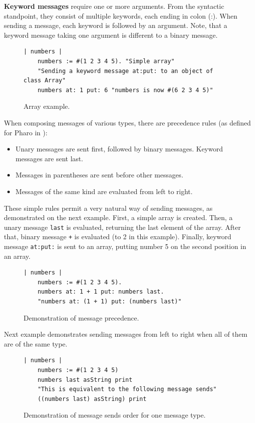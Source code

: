 \documentclass[thesis=M,english]{FITthesis}[2019/12/23]
\begin{document}
\textbf{Keyword messages} require one or more arguments. From the syntactic standpoint, they consist of
multiple keywords, each ending in colon (:). When sending a message, each keyword is followed by an argument.
Note, that a keyword message taking one argument is different to a binary message.
\begin{figure}[h!]
\begin{lstlisting}[language=Smalltalk]
	| numbers |
	numbers := #(1 2 3 4 5). "Simple array"
	"Sending a keyword message at:put: to an object of class Array"
	numbers at: 1 put: 6 "numbers is now #(6 2 3 4 5)"
\end{lstlisting}
\caption{Array example.}
\end{figure}

When composing messages of various types, there are precedence rules (as defined for Pharo in \cite{pharo-by-example}):
\begin{itemize}
	\item Unary messages are sent first, followed by binary messages. Keyword messages are sent last.
	\item Messages in parentheses are sent before other messages.
	\item Messages of the same kind are evaluated from left to right. 
\end{itemize}

These simple rules permit a very natural way of sending messages, as demonstrated on the next example.
First, a simple array is created. Then, a unary message \texttt{last} is evaluated, returning the last
element of the array. After that, binary message \texttt{+} is evaluated (to 2 in this example). Finally,
keyword message \texttt{at:put:} is sent to an array, putting number 5 on the second position in an array.
\begin{figure}[h!]
\begin{lstlisting}[language=Smalltalk]
	| numbers |
	numbers := #(1 2 3 4 5).
	numbers at: 1 + 1 put: numbers last.
	"numbers at: (1 + 1) put: (numbers last)"
\end{lstlisting}
\caption{Demonstration of message precedence.}
\end{figure}

Next example demonstrates sending messages from left to right when all of them are of the same type.
\begin{figure}[h!]
\begin{lstlisting}[language=Smalltalk]
	| numbers |
	numbers := #(1 2 3 4 5)
	numbers last asString print
	"This is equivalent to the following message sends"
	((numbers last) asString) print
\end{lstlisting}
\caption{Demonstration of message sends order for one message type.}
\end{figure}
\end{document}
